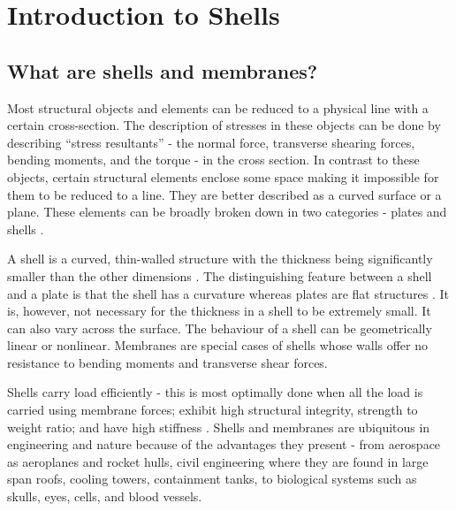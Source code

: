 \chapter{Introduction to Shells} %

\label{Chapter1} %


\newcommand{\keyword}[1]{\textbf{#1}}
\newcommand{\tabhead}[1]{\textbf{#1}}
\newcommand{\code}[1]{\texttt{#1}}
\newcommand{\file}[1]{\texttt{\bfseries#1}}
\newcommand{\option}[1]{\texttt{\itshape#1}}

\section{What are shells and membranes?}
Most structural objects and elements can be reduced to a physical line with a certain cross-section. The description of stresses
 in these objects can be done by describing  “stress resultants” - the normal force, transverse shearing forces, bending
 moments, and the torque - in the cross section. In contrast to these objects, certain structural elements enclose some space making it impossible for them to be reduced to a line. They are better described as a curved surface
 or a plane. These elements can be broadly broken down in two categories - plates and shells \cite{flugge2013}.

A shell is a curved, thin-walled structure with the thickness being significantly smaller than the other dimensions \cite{bischoff2004}.
 The distinguishing feature between a shell and a plate is that the shell has a curvature whereas plates are flat
 structures \cite{chen1997}. It is, however, not necessary for the thickness in a shell to be extremely small. It can also vary across
 the surface. The behaviour of a shell can be geometrically linear or nonlinear. Membranes are special cases of shells whose walls offer
 no resistance to bending moments and transverse shear forces. 

Shells carry load efficiently - this is most optimally done when all the load is carried using membrane forces; 
 exhibit high structural integrity, strength to weight ratio; and have high stiffness \cite{ventsel2001}.
 Shells and membranes are ubiquitous in engineering and nature because of the advantages they present - from aerospace as
 aeroplanes and rocket hulls, civil engineering where they are found in large span roofs, cooling towers, containment
 tanks, to biological systems such as skulls, eyes, cells, and blood vessels.
